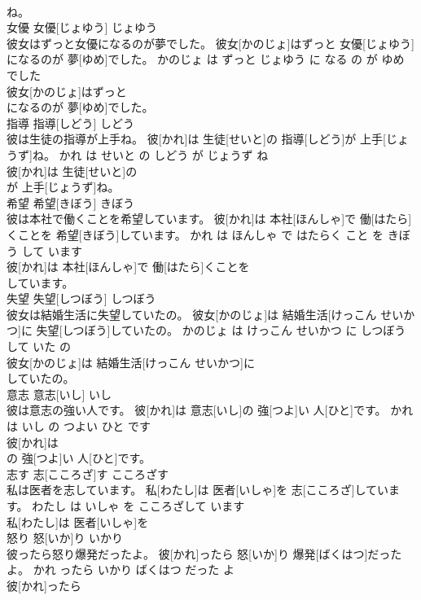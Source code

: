 \documentclass[8pt]{extreport}
\begin{document}
\begin{CJK}{UTF8}{min}
\\	ね。			
\\	女優	女優[じょゆう]	じょゆう	
\\	彼女はずっと女優になるのが夢でした。	彼女[かのじょ]はずっと 女優[じょゆう]になるのが 夢[ゆめ]でした。	かのじょ は ずっと じょゆう に なる の が ゆめ でした	
\\	彼女[かのじょ]はずっと
\\	になるのが 夢[ゆめ]でした。			
\\	指導	指導[しどう]	しどう	
\\	彼は生徒の指導が上手ね。	彼[かれ]は 生徒[せいと]の 指導[しどう]が 上手[じょうず]ね。	かれ は せいと の しどう が じょうず ね	
\\	彼[かれ]は 生徒[せいと]の
\\	が 上手[じょうず]ね。			
\\	希望	希望[きぼう]	きぼう	
\\	彼は本社で働くことを希望しています。	彼[かれ]は 本社[ほんしゃ]で 働[はたら]くことを 希望[きぼう]しています。	かれ は ほんしゃ で はたらく こと を きぼう して います	
\\	彼[かれ]は 本社[ほんしゃ]で 働[はたら]くことを
\\	しています。			
\\	失望	失望[しつぼう]	しつぼう	
\\	彼女は結婚生活に失望していたの。	彼女[かのじょ]は 結婚生活[けっこん せいかつ]に 失望[しつぼう]していたの。	かのじょ は けっこん せいかつ に しつぼう して いた の	
\\	彼女[かのじょ]は 結婚生活[けっこん せいかつ]に
\\	していたの。			
\\	意志	意志[いし]	いし	
\\	彼は意志の強い人です。	彼[かれ]は 意志[いし]の 強[つよ]い 人[ひと]です。	かれ は いし の つよい ひと です	
\\	彼[かれ]は
\\	の 強[つよ]い 人[ひと]です。			
\\	志す	志[こころざ]す	こころざす	
\\	私は医者を志しています。	私[わたし]は 医者[いしゃ]を 志[こころざ]しています。	わたし は いしゃ を こころざして います	
\\	私[わたし]は 医者[いしゃ]を
\\	怒り	怒[いか]り	いかり	
\\	彼ったら怒り爆発だったよ。	彼[かれ]ったら 怒[いか]り 爆発[ばくはつ]だったよ。	かれ ったら いかり ばくはつ だった よ	
\\	彼[かれ]ったら

\end{CJK}
\end{document}
